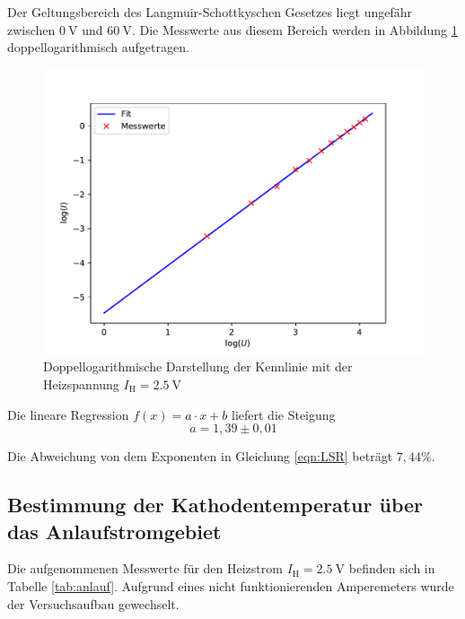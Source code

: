 Der Geltungsbereich des Langmuir-Schottkyschen Gesetzes liegt ungefähr zwischen $\SI{0}{\V}$ und $\SI{60}{\V}$.
Die Messwerte aus diesem Bereich werden in Abbildung \ref{fig:fit25} doppellogarithmisch aufgetragen.
\begin{figure}[H]
  \centering
  \includegraphics[width=\textwidth]{Plots/fit25.pdf}
  \caption{Doppellogarithmische Darstellung der Kennlinie mit der Heizspannung $I_\text{H} = \SI{2,5}{\V}$}
  \label{fig:fit25}
\end{figure}

Die lineare Regression $f(x) = a \cdot x + b$ liefert die Steigung
\begin{equation*}
  a = 1,39 \pm 0,01
\end{equation*}

Die Abweichung von dem Exponenten in Gleichung \eqref{eqn:LSR} beträgt $7,44 \%$.

\subsection{Bestimmung der Kathodentemperatur über das Anlaufstromgebiet}

Die aufgenommenen Messwerte für den Heizstrom $I_\text{H} = \SI{2,5}{\V}$ befinden sich in Tabelle \ref{tab:anlauf}.
Aufgrund eines nicht funktionierenden Amperemeters wurde der Versuchsaufbau gewechselt.


